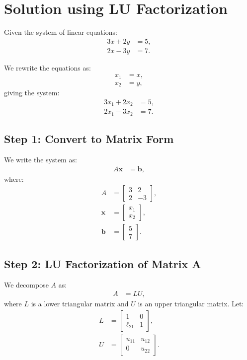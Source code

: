 \documentclass[journal]{IEEEtran}
\begin{document}
	\section*{Solution using LU Factorization}
	
	Given the system of linear equations:
	\begin{align}
		3x + 2y &= 5, \label{eq1} \\
		2x - 3y &= 7. \label{eq2}
	\end{align}
	
	We rewrite the equations as:
	\begin{align}
		x_1 &= x, \\
		x_2 &= y,
	\end{align}
	giving the system:
	\begin{align}
		3x_1 + 2x_2 &= 5, \label{eq3} \\
		2x_1 - 3x_2 &= 7. \label{eq4}
	\end{align}
	
	\subsection*{Step 1: Convert to Matrix Form}
	We write the system as:
	\begin{align}
		A \mathbf{x} &= \mathbf{b},
	\end{align}
	where:
	\begin{align}
		A &= \begin{bmatrix} 3 & 2 \\ 2 & -3 \end{bmatrix}, \\
		\mathbf{x} &= \begin{bmatrix} x_1 \\ x_2 \end{bmatrix}, \\
		\mathbf{b} &= \begin{bmatrix} 5 \\ 7 \end{bmatrix}.
	\end{align}
	
	\subsection*{Step 2: LU Factorization of Matrix A}
	We decompose $A$ as:
	\begin{align}
		A &= LU,
	\end{align}
	where $L$ is a lower triangular matrix and $U$ is an upper triangular matrix. Let:
	\begin{align}
		L &= \begin{bmatrix} 1 & 0 \\ \ell_{21} & 1 \end{bmatrix}, \\
		U &= \begin{bmatrix} u_{11} & u_{12} \\ 0 & u_{22} \end{bmatrix}.
	\end{align}
	
\end{document}
